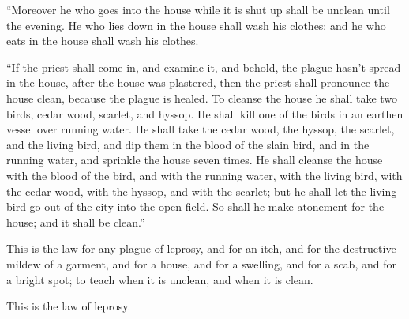 {\par }{\PP {}“Moreover he who goes into the house while it is shut up shall be unclean until the evening.
He who lies down in the house shall wash his clothes; and he who eats in the house shall wash his clothes.
\par }{\PP {}“If the priest shall come in, and examine it, and behold, the plague hasn’t spread in the house, after the house was plastered, then the priest shall pronounce the house clean, because the plague is healed.
To cleanse the house he shall take two birds, cedar wood, scarlet, and hyssop.
He shall kill one of the birds in an earthen vessel over running water.
He shall take the cedar wood, the hyssop, the scarlet, and the living bird, and dip them in the blood of the slain bird, and in the running water, and sprinkle the house seven times.
He shall cleanse the house with the blood of the bird, and with the running water, with the living bird, with the cedar wood, with the hyssop, and with the scarlet;
but he shall let the living bird go out of the city into the open field. So shall he make atonement for the house; and it shall be clean.”
\par }{\PP {}This is the law for any plague of leprosy, and for an itch,
and for the destructive mildew of a garment, and for a house,
and for a swelling, and for a scab, and for a bright spot;
to teach when it is unclean, and when it is clean.
\par }{\PP This is the law of leprosy.

}
